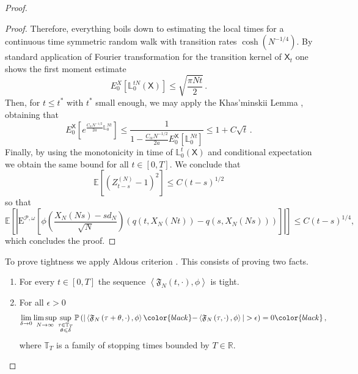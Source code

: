 \documentclass[a4paper,11pt,oneside,reqno]{amsart}
\theoremstyle{definition}
\renewcommand{\leq}{\leqslant}
\numberwithin{equation}{section}
\begin{document}
\begin{proof}
\begin{proof}
{					Therefore, everything boils down to estimating the local times for a continuous time symmetric random walk with transition rates $\cosh(N^{-1/4})$. 
					By standard application of Fourier transformation for the transition kernel of $\mathsf{X}_{t}$ one shows the first moment estimate
					\begin{equation*}
						E^{X}_{0}[\mathbb{L}_{0}^{tN}(\mathsf{X})]\leq \sqrt{\frac{\pi N t}{2}}\,.
					\end{equation*}
					Then, for $t\leq t^{*}$ with $t^{*}$ small enough, we may apply the Khas’minskii Lemma  \cite{Khasminskii1959}, obtaining that 
					\begin{equation*}
						E_{0}^{\mathsf{X}}\left[e^{\frac{C_{\alpha}N^{-1/2}}{2a}\mathbb{L}_{0}^{Nt}}\right]\leq \frac{1}{1-\frac{C_{\alpha}N^{-1/2}}{2a}E_{0}^{\mathsf{X}}[\mathbb{L}_{0}^{Nt}]}\leq  1+C\sqrt{t}\,.
					\end{equation*}
					Finally, by using the monotonicity in time of $\mathbb{L}_{0}^{t}(\mathsf{X})$ and conditional expectation we obtain the same bound for all $t\in [0,T]$. We conclude that 
					$$ \mathbb{E}\left[(Z_{t-s}^{(N)}-1)^{2}\right] \leq C (t-s)^{1/2}$$
					so that 
					$$\mathbb{E}\left[\left|\mathrm{E}^{\mathcal{P},\omega}\left[\phi\left(\frac{X_{N}(Ns)-sd_{N}}{\sqrt{N}}\right)\left(q(t,X_{N}(Nt))-q(s,X_{N}(Ns))\right)\right]\right|\right] \leq C  (t-s)^{1/4},$$
					which concludes the proof.}
\end{proof}
To prove tightness we apply Aldous criterion \cite{aldous, billingsley}. This consists of proving two facts.
\begin{enumerate}
	\item For every $t \in [0,T]$
	the sequence $\left\langle \mathfrak{F}_{N}\left(t,\cdot\right),\phi\right\rangle$ is tight.
	\item For all $\epsilon>0$
	\begin{equation*}
		\begin{split}
			\lim_{\delta \to 0} \limsup_{N \to \infty} \sup_{\substack{\tau\in \mathbb{T}_{T} \\ \theta \leq \delta}} 
			\mathbb{P} \left( |\left\langle \mathfrak{F}_{N}\left(\tau+\theta,\cdot\right),\phi\right\rangle{\color{black}-}\left\langle \mathfrak{F}_{N}\left(\tau,\cdot\right),\phi\right\rangle| > \epsilon \right)=0{\color{black}\,,}
		\end{split}
	\end{equation*}
	{\color{black} where $\mathbb{T}_{T}$ is a family of stopping times bounded by $T\in \mathbb{R}$. }
\end{enumerate} 

\end{proof}
\end{document}
